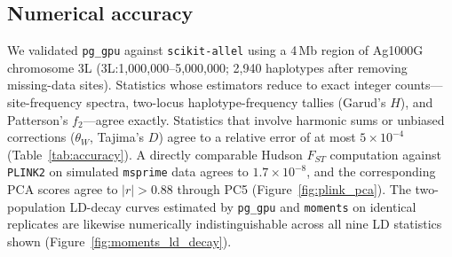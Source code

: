 \documentclass[12pt]{article}
\newcommand{\pggpu}{\texttt{pg\_gpu}\xspace}
\newcommand{\scikitallel}{\texttt{scikit-allel}\xspace}
\newcommand{\plinktwo}{\texttt{PLINK2}\xspace}
\newcommand{\moments}{\texttt{moments}\xspace}
\newcommand{\msprime}{\texttt{msprime}\xspace}
\begin{document}
\subsection*{Numerical accuracy}

We validated \pggpu against \scikitallel using a 4\,Mb region of Ag1000G
chromosome 3L (3L:1{,}000{,}000--5{,}000{,}000; 2{,}940 haplotypes after
removing missing-data sites). Statistics whose estimators reduce to
exact integer counts---site-frequency spectra, two-locus
haplotype-frequency tallies (Garud's $H$), and Patterson's
$f_2$---agree exactly. Statistics that involve harmonic sums or
unbiased corrections ($\theta_W$, Tajima's $D$) agree to a relative
error of at most $5\times 10^{-4}$ (Table~\ref{tab:accuracy}). A
directly comparable Hudson $F_{ST}$ computation against \plinktwo on
simulated \msprime data agrees to $1.7\times 10^{-8}$, and the
corresponding PCA scores agree to $|r| > 0.88$ through PC5
(Figure~\ref{fig:plink_pca}). The two-population LD-decay curves
estimated by \pggpu and \moments on identical replicates are likewise
numerically indistinguishable across all nine LD statistics shown
(Figure~\ref{fig:moments_ld_decay}).
\end{document}
